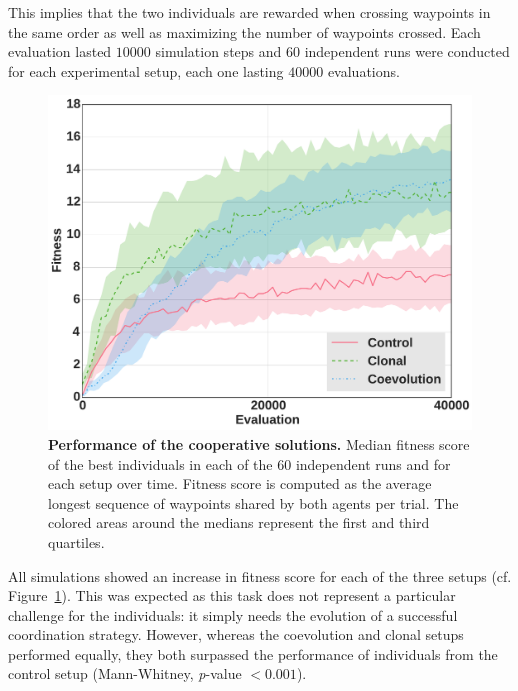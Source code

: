     This implies that the two individuals are rewarded when crossing waypoints in the same order as well as maximizing the number of waypoints crossed. Each evaluation lasted $10000$ simulation steps and $60$ independent runs were conducted for each experimental setup, each one lasting $40000$ evaluations.

    \begin{figure}[h]
      \begin{center}
        \includegraphics[scale = 0.4]{fig/ArticleRob1/fitnessWaypoints.pdf}
        \caption{\textbf{Performance of the cooperative solutions.}
        Median fitness score of the best individuals in each of the 60 independent runs and for each setup over time. Fitness score is computed as the average longest sequence of waypoints shared by both agents per trial. The colored areas around the medians represent the first and third quartiles.}
        \label{fig:WaypointsFitness}
      \end{center}
    \end{figure}

    All simulations showed an increase in fitness score for each of the three setups (cf. Figure~\ref{fig:WaypointsFitness}). This was expected as this task does not represent a particular challenge for the individuals: it simply needs the evolution of a successful coordination strategy. However, whereas the coevolution and clonal setups performed equally, they both surpassed the performance of individuals from the control setup (Mann-Whitney, {\em p}-value $< 0.001$).

